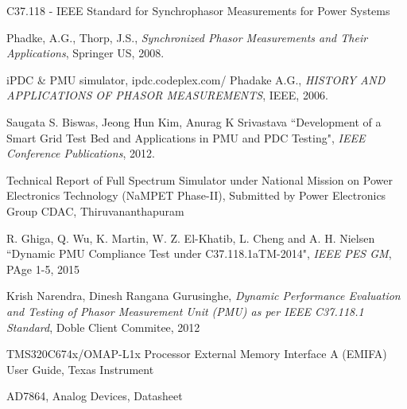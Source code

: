 \begin{thebibliography}{25}
 C37.118 - IEEE Standard for Synchrophasor Measurements for Power Systems

Phadke, A.G., Thorp, J.S.,  \textit{Synchronized Phasor Measurements and Their Applications}, Springer US, 2008.

iPDC \& PMU simulator, ipdc.codeplex.com/ 
Phadake A.G., \textit{HISTORY AND APPLICATIONS OF PHASOR MEASUREMENTS}, IEEE, 2006.

Saugata S. Biswas, Jeong Hun Kim, Anurag K Srivastava ``Development of a Smart Grid Test Bed and Applications in PMU and PDC Testing", \textit{IEEE Conference Publications}, 2012.

Technical Report of Full Spectrum Simulator under National Mission on Power Electronics Technology (NaMPET Phase-II), Submitted by Power Electronics Group CDAC, Thiruvananthapuram

R. Ghiga, Q. Wu, K. Martin, W. Z. El-Khatib, L. Cheng and A. H. Nielsen ``Dynamic PMU Compliance Test under C37.118.1aTM-2014", \textit{IEEE PES GM}, PAge 1-5, 2015

Krish Narendra, Dinesh Rangana Gurusinghe, \textit{Dynamic Performance Evaluation and Testing of Phasor Measurement Unit (PMU) as per IEEE C37.118.1 Standard}, Doble Client Commitee, 2012 

TMS320C674x/OMAP-L1x Processor External Memory Interface A (EMIFA) User Guide, Texas Instrument

AD7864, Analog Devices, Datasheet
\end{thebibliography}